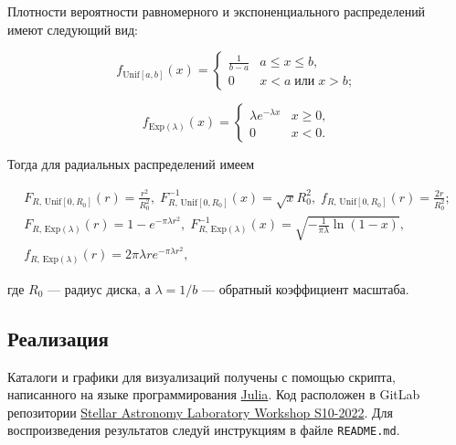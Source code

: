 \documentclass[a4paper, oneside]{article}
\newcommand{\su}{\vspace{-0.5em}}
\newcommand{\npar}{\par\vspace{\baselineskip}}
\begin{document}
Плотности вероятности равномерного и экспоненциального распределений \\ имеют следующий вид:

\su
\begin{equation}
  f_{\mathrm{Unif}[a, b]}(x) = \begin{cases}
    \frac{1}{b - a} & a \leq x \leq b, \\
    0 & x < a \; \textit{или} \; x > b;
  \end{cases}
\end{equation}

\su
\begin{equation}
  f_{\mathrm{Exp}(\lambda)}(x) = \begin{cases}
    \lambda e^{-\lambda x} & x \geq 0, \\
    0 & x < 0.
  \end{cases}
\end{equation}

Тогда для радиальных распределений имеем

\su
\begin{equation}
\begin{gathered}
  F_{R, \, \mathrm{Unif}[0, R_0]}(r) = \frac{r^2}{R_0^2}, \; F_{R, \, \mathrm{Unif}[0, R_0]}^{-1}(x) = \sqrt{x} R_0^2, \; f_{R, \, \mathrm{Unif}[0, R_0]}(r) = \frac{2 r}{R_0^2}; \\
F_{R, \, \mathrm{Exp}(\lambda)}(r) = 1 - e^{-\pi \lambda r^2}, \; F_{R, \, \mathrm{Exp}(\lambda)}^{-1}(x) = \sqrt{-\frac{1}{\pi \lambda} \ln{(1 - x)}}, \\
f_{R, \, \mathrm{Exp}(\lambda)}(r) = 2 \pi \lambda r e^{-\pi \lambda r^2},
\end{gathered}
\end{equation}

где $ R_0 $ --- радиус диска, а $ \lambda = 1 / b $ --- обратный коэффициент масштаба. \npar

\subsection*{Реализация}

Каталоги и графики для визуализаций получены с помощью скрипта, написанного на языке программирования \href{https://julialang.org}{Julia}. Код расположен в GitLab репозитории \href{https://gitlab.com/paveloom-g/university/s10-2022/stellar-astronomy-laboratory-workshop}{Stellar Astronomy Laboratory Workshop S10-2022}. Для воспроизведения результатов следуй инструкциям в файле {\footnotesize \texttt{README.md}}. \npar
\end{document}
